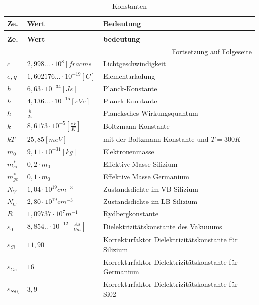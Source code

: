 \documentclass[12pt,a4paper]{article}%
\numberwithin{equation}{section}
\def\bracks#1{\left[ #1 \right]}
\numberwithin{equation}{subsection}
\begin{document}
	\begin{longtable} {|p{0.6cm}|p{4.4cm}|p{8.4cm}|} \hline
	\textbf{Ze.} & \textbf{Wert} & \textbf{Bedeutung}\\
	\hline
	\endfirsthead %
	\caption{Konstanten}\\ \hline
	\textbf{Ze.} & \textbf{Wert} & \textbf{bedeutung}\\
	\hline
	\endhead %
	\multicolumn{3}{r}{Fortsetzung auf Folgeseite}\\
	\endfoot
	\hline
	\endlastfoot
	
	$c$ & $2,998...\cdot 10^8 \bracks{frac{m}{s}}$ & Lichtgeschwindigkeit\\ \hline
	$e,q$ & $1,602176...\cdot 10^{-19}\bracks{C}$ & Elementarladung\\ \hline
	$h$ & $6,63 \cdot 10^{-34} \bracks{Js}$ & Planck-Konstante\\ \hline
	$h$ & $4,136...\cdot 10^{-15} \bracks{eVs}$ & Planck-Konstante\\ \hline
	$\hbar$ & $\frac{h}{2\pi}$ & Plancksches Wirkungsquantum\\ \hline
	$k$ & $8,6173 \cdot 10^{-5} \bracks{\frac{eV}{K}}$ & Boltzmann Konstante\\ \hline
	$kT$ & $25,85 \bracks{meV}$ & mit der Boltzmann Konstante und $T=300K$ \\ \hline
	$m_0$ & $9,11 \cdot 10^{-31} \bracks{kg}$ & Elektronenmasse\\ \hline
	$m^*_{si}$ & $0,2 \cdot m_0$ & Effektive Masse Silizium \\ \hline
	$m^*_{ge}$ & $0,1 \cdot m_0$ & Effektive Masse Germanium \\ \hline
	$N_V$ & $1,04\cdot 10^{19}cm^{-3}$ & Zustandsdichte im VB Silizium \\ \hline
	$N_C$ & $2,80\cdot 10^{19}cm^{-3}$ & Zustandsdichte im LB Silizium \\ \hline
	$R$ & $1,09737 \cdot 10^7 m^{-1} $ & Rydbergkonstante\\ \hline
	
	$\varepsilon_0$ & $8,854..\cdot 10^{-12}\bracks{\frac{As}{Vm}}$ & Dielektrizitätskonstante des Vakuuums \\ \hline
	$\varepsilon_{Si}$ & $11,90$ & Korrekturfaktor Dielektrizitätskonstante für Silizium\\ \hline
	$\varepsilon_{Ge}$ & $16$ & Korrekturfaktor Dielektrizitätskonstante für Germanium\\ \hline
	$\varepsilon_{Si0_2}$ & $3,9$ & Korrekturfaktor Dielektrizitätskonstante für Si02\\ \hline
	\end{longtable}
	\renewcommand{\arraystretch}{1}
	
\end{document}
